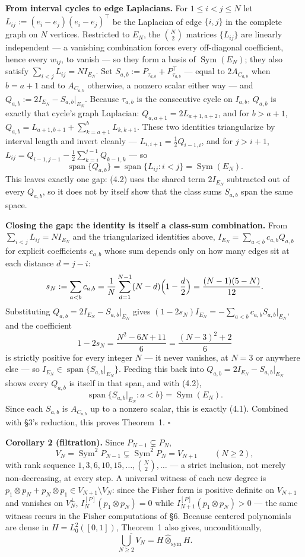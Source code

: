 \documentclass[11pt]{article}
\begin{document}
\textbf{From interval cycles to edge Laplacians.} For $1\le i<j\le N$ let $L_{ij}:=(e_i-e_j)(e_i-e_j)^\top$ be the Laplacian of edge $\{i,j\}$ in the complete graph on $N$ vertices. Restricted to $E_N$, the $\binom N2$ matrices $\{L_{ij}\}$ are linearly independent --- a vanishing combination forces every off-diagonal coefficient, hence every $w_{ij}$, to vanish --- so they form a basis of $\operatorname{Sym}(E_N)$; they also satisfy $\sum_{i<j}L_{ij}=NI_{E_N}$. Set $S_{a,b}:=P_{\tau_{a,b}}+P_{\tau_{a,b}}^\top$ --- equal to $2A_{C_{a,b}}$ when $b=a+1$ and to $A_{C_{a,b}}$ otherwise, a nonzero scalar either way --- and $Q_{a,b}:=2I_{E_N}-S_{a,b}|_{E_N}$. Because $\tau_{a,b}$ is the consecutive cycle on $I_{a,b}$, $Q_{a,b}$ is exactly that cycle's graph Laplacian: $Q_{a,a+1}=2L_{a+1,a+2}$, and for $b>a+1$, $Q_{a,b}=L_{a+1,b+1}+\sum_{k=a+1}^bL_{k,k+1}$. These two identities triangularize by interval length and invert cleanly --- $L_{i,i+1}=\tfrac12Q_{i-1,i}$, and for $j>i+1$, $L_{ij}=Q_{i-1,j-1}-\tfrac12\sum_{k=i}^{j-1}Q_{k-1,k}$ --- so \[ \operatorname{span}\{Q_{a,b}\}=\operatorname{span}\{L_{ij}:i<j\} =\operatorname{Sym}(E_N). \tag{4.2} \] This leaves exactly one gap: (4.2) uses the shared term $2I_{E_N}$ subtracted out of every $Q_{a,b}$, so it does not by itself show that the class sums $S_{a,b}$ span the same space.

\textbf{Closing the gap: the identity is itself a class-sum combination.} From $\sum_{i<j}L_{ij}=NI_{E_N}$ and the triangularized identities above, $I_{E_N}=\sum_{a<b}c_{a,b}Q_{a,b}$ for explicit coefficients $c_{a,b}$ whose sum depends only on how many edges sit at each distance $d=j-i$: \[ s_N:=\sum_{a<b}c_{a,b} =\frac1N\sum_{d=1}^{N-1}(N-d)\Bigl(1-\frac d2\Bigr) =\frac{(N-1)(5-N)}{12}. \] Substituting $Q_{a,b}=2I_{E_N}-S_{a,b}|_{E_N}$ gives $(1-2s_N)I_{E_N}=-\sum_{a<b}c_{a,b}S_{a,b}|_{E_N}$, and the coefficient \[ 1-2s_N=\frac{N^2-6N+11}6=\frac{(N-3)^2+2}6 \] is strictly positive for every integer $N$ --- it never vanishes, at $N=3$ or anywhere else --- so $I_{E_N}\in\operatorname{span}\{S_{a,b}|_{E_N}\}$. Feeding this back into $Q_{a,b}=2I_{E_N}-S_{a,b}|_{E_N}$ shows every $Q_{a,b}$ is itself in that span, and with (4.2), \[ \operatorname{span}\{S_{a,b}|_{E_N}:a<b\}=\operatorname{Sym}(E_N). \] Since each $S_{a,b}$ is $A_{C_{a,b}}$ up to a nonzero scalar, this is exactly (4.1). Combined with \S3's reduction, this proves Theorem~1. \(\square\)

\textbf{Corollary 2 (filtration).} Since $P_{N-1}\subsetneq P_N$, \[ V_N=\operatorname{Sym}^2P_{N-1}\subsetneq\operatorname{Sym}^2P_N=V_{N+1} \qquad(N\ge2), \] with rank sequence $1,3,6,10,15,\ldots,\binom N2,\ldots$ --- a strict inclusion, not merely non-decreasing, at every step. A universal witness of each new degree is $p_1\otimes p_N+p_N\otimes p_1\in V_{N+1}\setminus V_N$: since the Fisher form is positive definite on $V_{N+1}$ and vanishes on $V_N^\perp$, $I_N^{[P]}(p_1\otimes p_N)=0$ while $I_{N+1}^{[P]}(p_1\otimes p_N)>0$ --- the same witness recurs in the Fisher computations of \S6. Because centered polynomials are dense in $H=L_0^2([0,1])$, Theorem~1 also gives, unconditionally, \[ \overline{\bigcup_{N\ge2}V_N}=H\widehat\otimes_{\mathrm{sym}}H. \]
\end{document}
